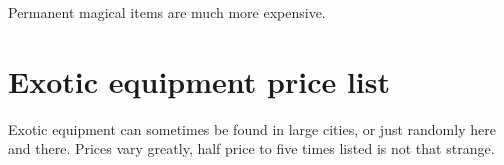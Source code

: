 \noindent
Permanent magical items are much more expensive.







\goodbreak
{}
\section*{Exotic equipment price list}

Exotic equipment can sometimes be found in large cities, or just randomly here and there. Prices vary greatly, half price to five times listed is not that strange.

